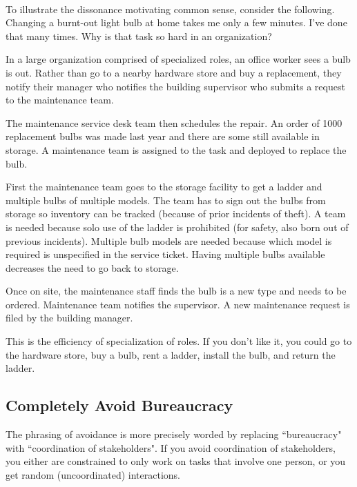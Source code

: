 \ \\

To illustrate the dissonance motivating common sense, consider the following. 
Changing a burnt-out light bulb at home takes me only a few minutes. I've done that many times. Why is that task so hard in an organization?

\begin{mdframed}
In a large organization comprised of specialized roles, an office worker sees a bulb is out. Rather than go to a nearby hardware store and buy a replacement, they notify their manager who notifies the building supervisor who submits a request to the maintenance team. 

The maintenance service desk team then schedules the repair. An order of 1000 replacement bulbs was made last year and there are some still available in storage. A maintenance team is assigned to the task and deployed to replace the bulb. 

First the maintenance team goes to the storage facility to get a ladder and multiple bulbs of multiple models. The team has to sign out the bulbs from storage so inventory can be tracked (because of prior incidents of theft). A team is needed because solo use of the ladder is prohibited (for safety, also born out of previous incidents). Multiple bulb models are needed because which model is required is unspecified in the service ticket. Having multiple bulbs available decreases the need to go back to storage. 

Once on site, the maintenance staff finds the bulb is a new type and needs to be ordered. Maintenance team notifies the supervisor. A new maintenance request is filed by the building manager.
\end{mdframed}

This is the efficiency of specialization of roles. If you don't like it, you could go to the hardware store, buy a bulb, rent a ladder, install the bulb, and return the ladder.


\subsection*{Completely Avoid Bureaucracy}
The phrasing of avoidance is more precisely worded by replacing ``bureaucracy" with ``coordination of stakeholders". If you avoid coordination of stakeholders, you either are constrained to only work on tasks that involve one person, or you get random (uncoordinated) interactions. 

